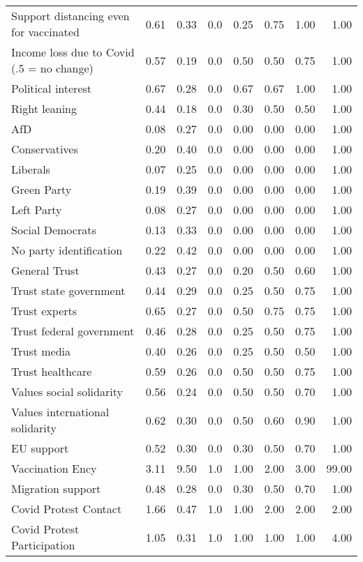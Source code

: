 \documentclass[12pt,oneside,smallheadings,chapterprefix=true]{article}
\begin{document}
\begin{table}
{\begin{tabular}[t]{lrrrrrrr}
Support distancing even for vaccinated & 0.61 & 0.33 & 0.0 & 0.25 & 0.75 & 1.00 & 1.00\\
Income loss due to Covid (.5 = no change) & 0.57 & 0.19 & 0.0 & 0.50 & 0.50 & 0.75 & 1.00\\
Political interest & 0.67 & 0.28 & 0.0 & 0.67 & 0.67 & 1.00 & 1.00\\
Right leaning & 0.44 & 0.18 & 0.0 & 0.30 & 0.50 & 0.50 & 1.00\\
AfD & 0.08 & 0.27 & 0.0 & 0.00 & 0.00 & 0.00 & 1.00\\
Conservatives & 0.20 & 0.40 & 0.0 & 0.00 & 0.00 & 0.00 & 1.00\\
Liberals & 0.07 & 0.25 & 0.0 & 0.00 & 0.00 & 0.00 & 1.00\\
Green Party & 0.19 & 0.39 & 0.0 & 0.00 & 0.00 & 0.00 & 1.00\\
Left Party & 0.08 & 0.27 & 0.0 & 0.00 & 0.00 & 0.00 & 1.00\\
Social Democrats & 0.13 & 0.33 & 0.0 & 0.00 & 0.00 & 0.00 & 1.00\\
No party identification & 0.22 & 0.42 & 0.0 & 0.00 & 0.00 & 0.00 & 1.00\\
General Trust & 0.43 & 0.27 & 0.0 & 0.20 & 0.50 & 0.60 & 1.00\\
Trust state government & 0.44 & 0.29 & 0.0 & 0.25 & 0.50 & 0.75 & 1.00\\
Trust experts & 0.65 & 0.27 & 0.0 & 0.50 & 0.75 & 0.75 & 1.00\\
Trust federal government & 0.46 & 0.28 & 0.0 & 0.25 & 0.50 & 0.75 & 1.00\\
Trust media & 0.40 & 0.26 & 0.0 & 0.25 & 0.50 & 0.50 & 1.00\\
Trust healthcare & 0.59 & 0.26 & 0.0 & 0.50 & 0.50 & 0.75 & 1.00\\
Values social solidarity & 0.56 & 0.24 & 0.0 & 0.50 & 0.50 & 0.70 & 1.00\\
Values international solidarity & 0.62 & 0.30 & 0.0 & 0.50 & 0.60 & 0.90 & 1.00\\
EU support & 0.52 & 0.30 & 0.0 & 0.30 & 0.50 & 0.70 & 1.00\\
Vaccination Ency & 3.11 & 9.50 & 1.0 & 1.00 & 2.00 & 3.00 & 99.00\\
Migration support & 0.48 & 0.28 & 0.0 & 0.30 & 0.50 & 0.70 & 1.00\\
Covid Protest Contact & 1.66 & 0.47 & 1.0 & 1.00 & 2.00 & 2.00 & 2.00\\
Covid Protest Participation & 1.05 & 0.31 & 1.0 & 1.00 & 1.00 & 1.00 & 4.00\\

\end{tabular}}
\end{table}
\end{document}
